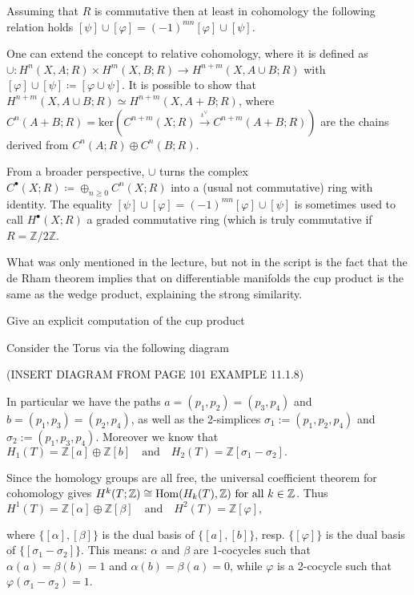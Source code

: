 Assuming that \( R \) is commutative then at least in cohomology the following relation holds
\( [\psi] \cup [\varphi] = (-1)^{mn}[\varphi] \cup [\psi] \).

One can extend the concept to relative cohomology, where it is defined as
\( \cup : H^n(X, A;R) \times H^m(X, B;R) \to H^{n+m}(X, A \cup B;R) \) with \( [\varphi] \cup [\psi] \coloneqq [\varphi \cup \psi] \).
It is possible to show that \(H^{n+m}(X, A \cup B;R) \simeq H^{n+m}(X, A + B;R) \), where \( C^n(A+B;R) = \text{ker}(C^{n+m}(X;R) \xrightarrow{\iota^\vee} C^{n+m}(A+B;R)) \) 
are the chains derived from \( C^n(A;R) \oplus C^n(B;R) \).

From a broader perspective, \( \cup \) turns the complex \( C^\bullet(X;R) \coloneqq \oplus_{n \geq 0} C^n(X;R) \) into a (usual not commutative) ring with identity.
The equality \( [\psi] \cup [\varphi] = (-1)^{mn}[\varphi] \cup [\psi] \) is sometimes used to call \( H^\bullet(X;R) \) a graded commutative ring 
(which is truly commutative if \( R = \mathbb{Z}/2\mathbb{Z} \).

What was only mentioned in the lecture, but not in the script is the fact that the de Rham theorem implies that on differentiable manifolds
the cup product is the same as the wedge product, explaining the strong similarity. 


Give an explicit computation of the cup product 

Consider the Torus via the following diagram

(INSERT DIAGRAM FROM PAGE 101 EXAMPLE 11.1.8)

In particular we have the paths \(a = (p_1, p_2) = (p_3, p_4)\) and \(b = (p_1, p_3) = (p_2, p_4)\), 
as well as the 2-simplices \(\sigma_1 := (p_1, p_2, p_4)\) and \(\sigma_2 := (p_1, p_3, p_4)\). 
Moreover we know that 
\(
H_1(T) = \mathbb{Z} [a] \oplus \mathbb{Z} [b] \quad \text{and} \quad H_2(T) = \mathbb{Z} [\sigma_1 - \sigma_2].
\)

Since the homology groups are all free, the universal coefficient theorem for cohomology gives \(H^k(T; \mathbb{Z}) \cong \operatorname{Hom}(H_k(T), \mathbb{Z})$ for all $k \in \mathbb{Z}\). 
Thus
\(
H^1(T) = \mathbb{Z} [\alpha] \oplus \mathbb{Z} [\beta] \quad \text{and} \quad H^2(T) = \mathbb{Z}[\varphi],
\)

where \(\{[\alpha], [\beta]\}\) is the dual basis of \(\{[a], [b]\}\), resp. \(\{[\varphi]\}\) is the dual basis of \(\{[\sigma_1 - \sigma_2]\}\). 
This means: \(\alpha\) and \(\beta\) are 1-cocycles such that \(\alpha(a) = \beta(b) = 1\) and \(\alpha(b) = \beta(a) = 0\), while \(\varphi\) is a 2-cocycle such that 
\(\varphi(\sigma_1 - \sigma_2) = 1\).

